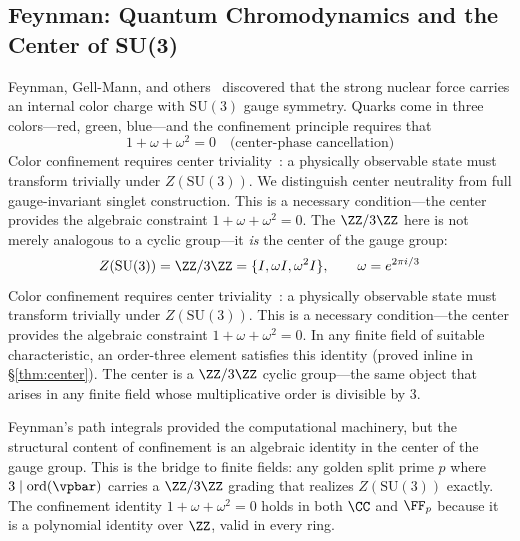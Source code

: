 \subsection{Feynman: Quantum Chromodynamics and the Center of SU(3)}

Feynman, Gell-Mann, and others~\cite{feynman_qcd,gellmann} discovered that the strong nuclear force carries an internal color charge with $\mathrm{SU}(3)$ gauge symmetry. Quarks come in three colors---red, green, blue---and the confinement principle requires that 
\begin{equation}\label{eq:confinement}
1 + \omega + \omega^2 = 0 \quad \text{(center-phase cancellation)}
\end{equation}
Color confinement requires center triviality~\cite{greensite}: a physically observable state must transform trivially under $Z(\mathrm{SU}(3))$. We distinguish center neutrality from full gauge-invariant singlet construction. This is a necessary condition---the center provides the algebraic constraint $1 + \omega + \omega^2 = 0$. The $\ZZ/3\ZZ$ here is not merely analogous to a cyclic group---it \emph{is} the center of the gauge group:
\begin{equation}\label{eq:center}
Z(\mathrm{SU}(3)) = \ZZ/3\ZZ = \{I, \omega I, \omega^2 I\}, \qquad \omega = e^{2\pi i/3}
\end{equation}
Color confinement requires center triviality~\cite{greensite}: a physically observable state must transform trivially under $Z(\mathrm{SU}(3))$. This is a necessary condition---the center provides the algebraic constraint $1 + \omega + \omega^2 = 0$. In any finite field of suitable characteristic, an order-three element satisfies this identity (proved inline in \S\ref{thm:center}). The center is a $\ZZ/3\ZZ$ cyclic group---the same object that arises in any finite field whose multiplicative order is divisible by 3.

Feynman's path integrals provided the computational machinery, but the structural content of confinement is an algebraic identity in the center of the gauge group. This is the bridge to finite fields: any golden split prime $p$ where $3 \mid \mathrm{ord}(\vpbar)$ carries a $\ZZ/3\ZZ$ grading that realizes $Z(\mathrm{SU}(3))$ exactly. The confinement identity $1 + \omega + \omega^2 = 0$ holds in both $\CC$ and $\FF_p$ because it is a polynomial identity over $\ZZ$, valid in every ring.



